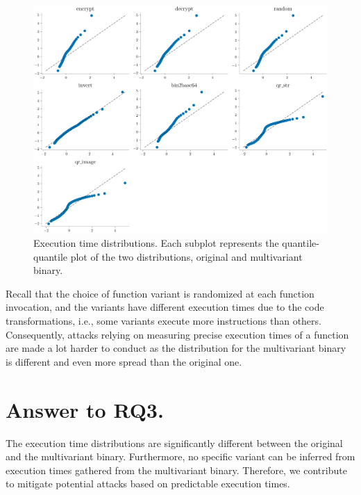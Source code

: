 \begin{figure}[h]
    \includegraphics[width=\linewidth]{plots/qqplots.pdf}
    \caption{Execution time distributions. Each subplot represents the quantile-quantile plot of the two distributions, original and multivariant binary. }
    \label{rq3:diversity:times}
\end{figure}

Recall that the choice of function variant is randomized at each function invocation, and the variants have different execution times due to the code transformations, i.e., some variants execute more instructions than others. 
Consequently, attacks relying on measuring precise execution times \cite{blackhatpaper} of a function are made a lot harder to conduct as the distribution for the multivariant binary is different and even more spread than the original one.

\section{Answer to RQ3.}


The execution time distributions are significantly different between the original and the multivariant binary. Furthermore, no specific variant can be inferred from execution times gathered from the multivariant binary. Therefore, we contribute to mitigate potential attacks based on predictable execution times.